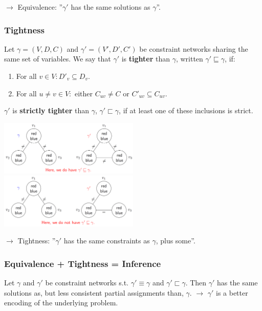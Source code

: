 \documentclass[conference, a4paper]{styles/acmsiggraph}
\begin{document}
            $\rightarrow$ Equivalence: ''$\gamma'$ has the same solutions as $\gamma$''.
        
        \subsubsection{Tightness}
            Let $\gamma = (V,D,C)$ and $\gamma' = (V',D',C')$ be constraint networks sharing the same set of variables.
            We say that $\gamma'$ is \textbf{tighter} than $\gamma$, written $\gamma' \sqsubseteq \gamma$, if:
                \begin{enumerate}
                    \item For all $v \in V: D'_v \subseteq D_v$.
                    \item For all $u \neq v \in V:$ either $C_{uv} \neq C$ or $C'_{uv} \subseteq C_{uv}$.
                \end{enumerate}
            $\gamma'$ is \textbf{strictly tighter} than $\gamma$, $\gamma' \sqsubset \gamma$, if at least one of these inclusions is strict.
            
            \includegraphics[width=0.5\textwidth]{imgs/TIGHTNESS_1.png}\ \ \ \ \ \ 
            \includegraphics[width=0.5\textwidth]{imgs/TIGHTNESS_2.png}\newline
            
            $\rightarrow$ Tightness: ''$\gamma'$ has the same constraints as $\gamma$, plus some''.
            
        \subsubsection{Equivalence + Tightness = Inference}
            Let $\gamma$ and $\gamma'$ be constraint networks s.t. $\gamma' \equiv \gamma$ and $\gamma' \sqsubset \gamma$.
            Then $\gamma'$ has the same solutions as, but less consistent partial assignments than, $\gamma$.\newline
            $\rightarrow$ $\gamma'$ is a better encoding of the underlying problem.
            
\end{document}

